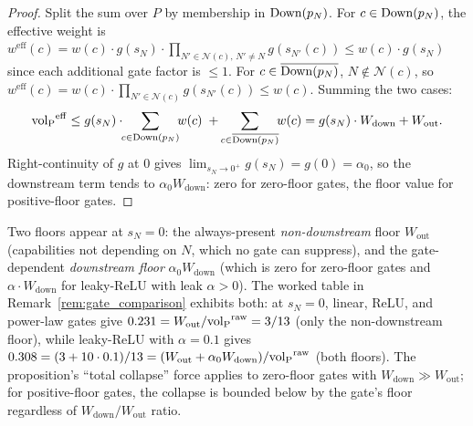 \begin{proof}
Split the sum over $P$ by membership in $\mathrm{Down}(p_N)$.  For
$c \in \mathrm{Down}(p_N)$, the effective weight is
$w^{\mathrm{eff}}(c) = w(c) \cdot g(s_N) \cdot \prod_{N' \in
\mathcal{N}(c),\, N' \neq N} g(s_{N'}(c)) \leq w(c) \cdot g(s_N)$
since each additional gate factor is $\leq 1$.  For
$c \in \overline{\mathrm{Down}(p_N)}$, $N \notin \mathcal{N}(c)$, so
$w^{\mathrm{eff}}(c) = w(c) \cdot \prod_{N' \in \mathcal{N}(c)}
g(s_{N'}(c)) \leq w(c)$.  Summing the two cases:
\[
  \volL^{\mathrm{eff}}
  \leq g(s_N) \cdot \!\!\sum_{c \in \Down(p_N)}\!\! w(c)
       \;+\; \!\!\sum_{c \in \overline{\Down(p_N)}}\!\! w(c)
  = g(s_N) \cdot W_{\mathrm{down}} + W_{\mathrm{out}}.
\]
Right-continuity of $g$ at $0$ gives $\lim_{s_N \to 0^+} g(s_N)
= g(0) = \alpha_0$, so the downstream term tends to $\alpha_0
W_{\mathrm{down}}$: zero for zero-floor gates, the floor value
for positive-floor gates.
\end{proof}

\begin{remark}
\label{rem:nondownstream_floor}
Two floors appear at $s_N = 0$: the always-present
\emph{non-downstream} floor $W_{\mathrm{out}}$ (capabilities
not depending on $N$, which no gate can suppress), and the
gate-dependent \emph{downstream floor} $\alpha_0
W_{\mathrm{down}}$ (which is zero for zero-floor gates and
$\alpha \cdot W_{\mathrm{down}}$ for leaky-ReLU with leak
$\alpha > 0$).  The worked table in
Remark~\ref{rem:gate_comparison} exhibits both: at $s_N = 0$,
linear, ReLU, and power-law gates give $0.231 =
W_{\mathrm{out}}/{\operatorname{vol}_{\mathrm{P}}}^{\mathrm{raw}} = 3/13$ (only the
non-downstream floor), while leaky-ReLU with $\alpha = 0.1$
gives $0.308 = (3 + 10 \cdot 0.1)/13 = (W_{\mathrm{out}} +
\alpha_0 W_{\mathrm{down}})/{\operatorname{vol}_{\mathrm{P}}}^{\mathrm{raw}}$ (both floors).
The proposition's ``total collapse'' force applies to zero-floor
gates with $W_{\mathrm{down}} \gg W_{\mathrm{out}}$; for
positive-floor gates, the collapse is bounded below by the
gate's floor regardless of $W_{\mathrm{down}}/W_{\mathrm{out}}$
ratio.
\end{remark}

